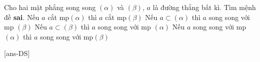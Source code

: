 \begin{ex}%
	Cho hai mặt phẳng song song $(\alpha)$ và $(\beta)$, $a$ là đường thẳng bất kì. Tìm mệnh đề \textbf{sai}.
\choice
{Nếu $a$ cắt mp$(\alpha)$ thì $a$ cắt mp$(\beta)$}
{Nếu $a \subset (\alpha)$ thì $a$ song song với mp $(\beta)$}
{Nếu $a \subset (\beta)$ thì $a$ song song với mp $(\alpha)$}
{\True Nếu $a$ song song với mp$(\alpha)$ thì $a$ song song với mp$(\beta)$}
\end{ex}


\cauds

[ans-DS]

